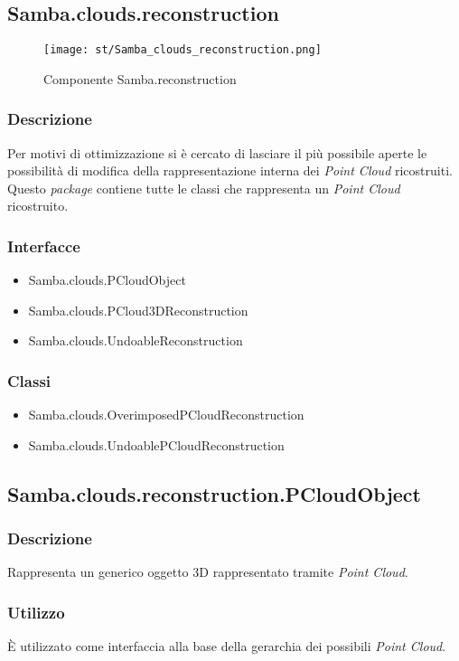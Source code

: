 \subsection{Samba.clouds.reconstruction}
\begin{figure}[!h] 
    \centering 
    \texttt{[image: st/Samba\_clouds\_reconstruction.png]} 
    \caption{Componente Samba.reconstruction}
\end{figure}
\subsubsection{Descrizione}
Per motivi di ottimizzazione si è cercato di lasciare il più possibile aperte le possibilità di modifica della rappresentazione interna dei \emph{Point Cloud} ricostruiti. Questo \emph{package} contiene tutte le classi che rappresenta un \emph{Point Cloud} ricostruito.
\subsubsection{Interfacce}
\begin{itemize}
	\item Samba.clouds.PCloudObject
	\item Samba.clouds.PCloud3DReconstruction
	\item Samba.clouds.UndoableReconstruction
\end{itemize}
\subsubsection{Classi}
\begin{itemize}
	\item Samba.clouds.OverimposedPCloudReconstruction
	\item Samba.clouds.UndoablePCloudReconstruction
\end{itemize}

\subsection{Samba.clouds.reconstruction.PCloudObject}
\subsubsection{Descrizione}
Rappresenta un generico oggetto 3D rappresentato tramite \emph{Point Cloud}.
\subsubsection{Utilizzo}
È utilizzato come interfaccia alla base della gerarchia dei possibili \emph{Point Cloud}.
